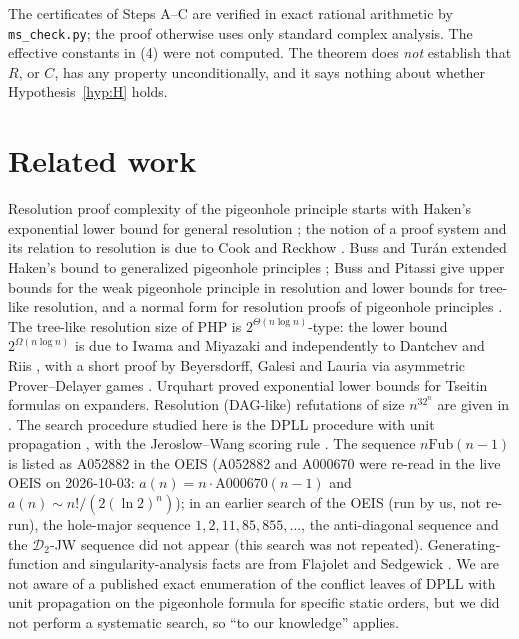 \documentclass[11pt]{article}
\theoremstyle{definition}
\theoremstyle{remark}
\newcommand{\PHP}{\mathrm{PHP}}
\newcommand{\Fub}{\mathrm{Fub}}
\begin{document}
The certificates of Steps A--C are verified in exact rational arithmetic by \texttt{ms\_check.py}; the proof otherwise uses only standard complex analysis. The effective constants in (4) were not computed.
The theorem does \emph{not} establish that $R$, or $C$, has any property unconditionally, and it says nothing about whether Hypothesis~\ref{hyp:H} holds.

\section{Related work}\label{sec:related}

Resolution proof complexity of the pigeonhole principle starts with Haken's exponential lower bound for general resolution \cite{Haken85}; the notion of a proof system and
its relation to resolution is due to Cook and Reckhow \cite{CR79}. Buss and Tur\'an extended Haken's bound to generalized pigeonhole principles \cite{BT88}; Buss and Pitassi give upper bounds for the weak pigeonhole principle in resolution and
lower bounds for tree-like resolution, and a normal form for resolution proofs of pigeonhole principles \cite{BP98}.
The tree-like resolution size of $\PHP$ is $2^{\Theta(n\log n)}$-type: the lower bound $2^{\Omega(n\log n)}$ is due to Iwama and Miyazaki \cite{IM99} and independently to Dantchev and Riis \cite{DR01}, with a short proof by Beyersdorff, Galesi and Lauria via asymmetric Prover--Delayer games \cite{BGL10}. Urquhart \cite{Urq87} proved exponential lower bounds for Tseitin formulas on expanders. Resolution (DAG-like) refutations of size $n^32^n$ are given in \cite{BP98}.
The search procedure studied here is the DPLL procedure with unit propagation \cite{DP60,DLL62}, with the Jeroslow--Wang scoring rule \cite{JW90}. The sequence $n\Fub(n-1)$ is listed as A052882 in the OEIS \cite{OEIS}
(A052882 and A000670 were re-read in the live OEIS on 2026-10-03: $a(n)=n\cdot\mathrm{A000670}(n-1)$ and $a(n)\sim n!/(2(\ln2)^n)$); in an earlier search of the OEIS (run by us, not re-run), the hole-major sequence $1,2,11,85,855,\dots$, the anti-diagonal sequence
and the $\mathcal D_2$-JW sequence did not appear (this search was not repeated). Generating-function and singularity-analysis facts are from Flajolet and Sedgewick \cite{FS09}.
We are not aware of a published exact enumeration of the conflict leaves of DPLL with unit propagation on the pigeonhole formula for specific static orders, but we did not perform a systematic search, so ``to our knowledge'' applies.
\end{document}
